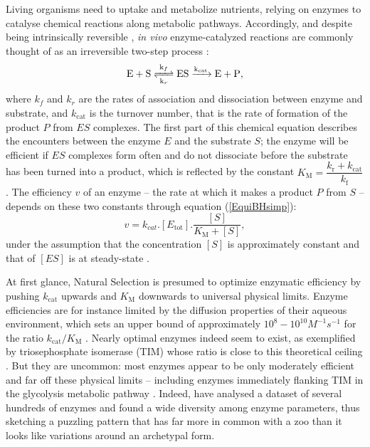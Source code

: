 Living organisms need to uptake and metabolize nutrients, relying on enzymes to catalyse chemical reactions along metabolic pathways. Accordingly, and despite being intrinsically reversible \citep{Haldane30,Klipp94}, \textit{in vivo} enzyme-catalyzed reactions are commonly thought of as an irreversible two-step process \citep{MichaelisMenten1913,Bar-Even11,Bar-Even15,Johnson11}:
\begin{equation}
\ce{ E + S <=>[k_{f}][k_{r}] ES ->[k_{cat}] E + P },
\label{chemMM}
\end{equation}
where $k_f$ and $k_r$ are the rates of association and dissociation between enzyme and substrate, and $k_\text{cat}$ is the turnover number, that is the rate of formation of the product $P$ from $ES$ complexes. The first part of this chemical equation describes the encounters between the enzyme $E$ and the substrate $S$; the enzyme will be efficient if $ES$ complexes form often and do not dissociate before the substrate has been turned into a product, which is reflected by the constant $K_\text{M}=\dfrac{k_\text{r}+k_\text{cat}}{k_\text{f}}$. The efficiency $v$ of an enzyme -- the rate at which it makes a product $P$ from $S$ -- depends on these two constants through equation (\ref{EquiBHsimp}):
\begin{equation}
v=k_{cat}.[E_\text{tot}].\frac{[S]}{K_\text{M}+[S]},
\label{EquiBHsimp}
\end{equation}
\noindent under the assumption that the concentration $[S]$ is approximately constant and that of $[ES]$ is at steady-state \citep{MichaelisMenten1913, Briggs25}.
 
At first glance, Natural Selection is presumed to optimize enzymatic efficiency by pushing $k_\text{cat}$ upwards and $K_\text{M}$ downwards to universal physical limits. Enzyme efficiencies are for instance limited by the diffusion properties of their aqueous environment, which sets an upper bound of approximately $10^8-10^{10} M^{-1}s^{-1}$ for the ratio ${k_\text{cat}}/{K_\text{M}}$  \citep{Alberty58,Zhou82}. Nearly optimal enzymes indeed seem to exist, as exemplified by triosephosphate isomerase (TIM) whose ratio is close to this theoretical ceiling \citep{Knowles77}. But they are uncommon: most enzymes appear to be only moderately efficient and far off these physical limits -- including enzymes immediately flanking TIM in the glycolysis metabolic pathway \citep{Davidi18}.
Indeed, \citet{Bar-Even11} have analysed a dataset of several hundreds of enzymes and found a wide diversity among enzyme parameters, thus sketching a puzzling pattern that has far more in common with a zoo than it looks like variations around an archetypal form.\\

